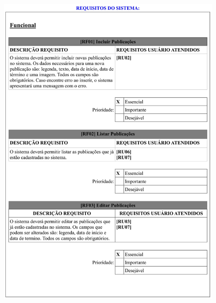\begin{figure}
    \includegraphics[width=\textwidth]{documentacao/ModeloArtefatos-02.jpg}
\end{figure}

